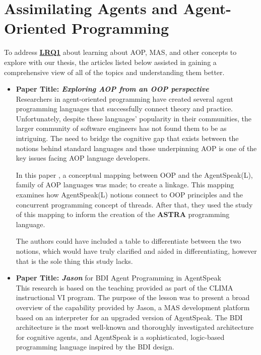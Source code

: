 \section{Assimilating Agents and Agent-Oriented Programming}

To address \hyperref[LRQ1.]{\textbf{LRQ1}} about learning about \ac{AOP}, \ac{MAS}, and other concepts to explore with our thesis, the articles listed below assisted in gaining a comprehensive view of all of the topics and understanding them better.

\begin{itemize}[label={}]
\item \textbf{Paper Title: \textit{Exploring \ac{AOP} from an \ac{OOP} perspective}}\\

Researchers in agent-oriented programming have created several agent programming languages that successfully connect theory and practice. Unfortunately, despite these languages' popularity in their communities, the larger community of software engineers has not found them to be as intriguing. The need to bridge the cognitive gap that exists between the notions behind standard languages and those underpinning \ac{AOP} is one of the key issues facing \ac{AOP} language developers. 

 \vspace{.5cm}
 
In this paper \cite{astra}, a conceptual mapping between \ac{OOP} and the AgentSpeak(L), family of \ac{AOP} languages was made; to create a linkage. This mapping examines how AgentSpeak(L) notions connect to \ac{OOP} principles and the concurrent programming concept of threads. After that, they used the study of this mapping to inform the creation of the \textbf{ASTRA} programming language.

 \vspace{.5cm}

 The authors could have included a table to differentiate between the two notions, which would have truly clarified and aided in differentiating, however that is the sole thing this study lacks.
 
 \vspace{.5cm}
 
\item \textbf{Paper Title: \textit{Jason}} for \ac{BDI} Agent Programming in AgentSpeak \\

This research \cite{jasonBDI} is based on the teaching provided as part of the CLIMA instructional VI program. The purpose of the lesson was to present a broad overview of the capability provided by Jason, a \ac{MAS} development platform based on an interpreter for an upgraded version of AgentSpeak. The \ac{BDI} architecture is the most well-known and thoroughly investigated architecture for cognitive agents, and AgentSpeak is a sophisticated, logic-based programming language inspired by the \ac{BDI} design.


\end{itemize}
